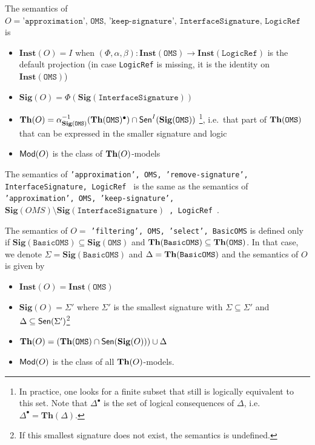 \documentclass[10pt,fleqn,%
\ifpretendfinal
final%
\else
draft%
\fi,
]{scrreprt}
\newcommand*{\syntax}[1]{\texttt{#1}}
\newcommand{\Sig}{\mathbf{Sig}}
\newcommand{\Inst}{\ensuremath{\mathbf{Inst}}}
\begin{document}
The semantics of $O = \syntax{'approximation', OMS, 
'keep-signature', InterfaceSignature, LogicRef }$ is
\begin{itemize}
  \item $\Inst(O) = I$ when $(\Phi,\alpha,\beta) : \Inst(\syntax{OMS}) \to \Inst(\syntax{LogicRef})$ is the default projection (in case \syntax{LogicRef} is missing, it is the identity on $\Inst(\syntax{OMS})$)
  \item $\Sig(O) =
   \Phi(\Sig(\syntax{InterfaceSignature}))$
  \item $\Th(O) = \alpha^{-1}_{\Sig(\syntax{OMS})}(\Th(\syntax{OMS})^\bullet)\cap\Sen^I(\Sig(\syntax{OMS}))$
  \footnote{In practice, one looks for a finite subset that still is logically equivalent to this set. Note that $\Delta^\bullet$ is the set of logical consequences of $\Delta$, i.e.\ $\Delta^\bullet = \mathbf{Th}(\Delta)$.}, i.e.\ that part of $\Th(\syntax{OMS})$ that can be expressed in the smaller signature and logic 
  \item $\mathsf{Mod}(O)$ is the class of $\mathbf{Th}(O)$-models
\end{itemize}

The semantics of 
\syntax{'approximation', OMS, 
'remove-signature', InterfaceSignature, LogicRef }
is the same as the semantics of
\syntax{'approximation', OMS, 
'keep-signature', $\Sig(OMS)\setminus \Sig(\syntax{InterfaceSignature})$ , LogicRef }.



The semantics of $O =$ 
\syntax{'filtering', OMS, 'select', BasicOMS}
is
defined only if  $\Sig(\syntax{BasicOMS})\subseteq\Sig(\syntax{OMS})$ and $\Th(\syntax{BasicOMS})\subseteq\Th(\syntax{OMS})$.
In that case, we denote
$\Sigma = \Sig(\syntax{BasicOMS})$ and
$\Delta = \Th(\syntax{BasicOMS})$ and 
the semantics of $O$ is given by
\begin{itemize}
  \item $\Inst(O) = \Inst(\syntax{OMS})$
  \item $\Sig(O) = \Sigma'$ where $\Sigma'$ is the smallest signature
with $\Sigma\subseteq\Sigma'$ and $\Delta\subseteq\mathsf{Sen}(\Sigma')$\footnote
{If this smallest signature does not exist, the semantics is undefined.}
  \item $\Th(O) = (\Th(\syntax{OMS})\cap\Sen(\Sig(O)))\cup\Delta$
  \item $\mathsf{Mod}(O)$ is the class of all $\mathbf{Th}(O)$-models.
\end{itemize}
\end{document}
